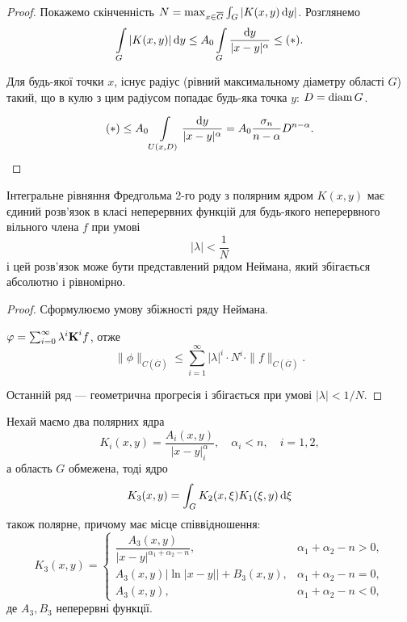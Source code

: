 \begin{proof}
	Покажемо скінченність $N = \max_{x \in \overline G} \int_G |K(x, y) \diff y|$. Розглянемо 
	\begin{equation}
		\Int_G |K(x,y)| \diff y \le A_0 \Int_G \dfrac{\diff y}{|x - y|^\alpha} \le (*).
	\end{equation}

	Для будь-якої точки $x$, існує радіус (рівний максимальному діаметру області $G$) такий, що в кулю з цим радіусом попадає будь-яка точка $y$: $D = \diam G$.

	\begin{equation}
		(*) \le A_0 \Int_{U(x, D)} \dfrac{\diff y}{|x - y|^\alpha} = A_0 \dfrac{\sigma_n}{n - \alpha} D^{n - \alpha}.
	\end{equation}
\end{proof}

\begin{theorem}
	Інтегральне рівняння Фредгольма 2-го роду з полярним ядром $K(x, y)$ має єдиний розв'язок в класі неперервних функцій для будь-якого неперервного вільного члена $f$ при умові
	\begin{equation}
		|\lambda| < \dfrac{1}{N}
	\end{equation}
	і цей розв'язок може бути представлений рядом Неймана, який збігається абсолютно і рівномірно.
\end{theorem}

\begin{proof}
	Сформулюємо умову збіжності ряду Неймана. \medskip

	$\phi = \sum_{i = 0}^\infty \lambda^i \bf{K}^i f$, отже 
	\begin{equation}
		\|\phi\|_{C\left(\overline G\right)} \le \sum_{i = 1}^\infty |\lambda|^i \cdot N^i \cdot \|f\|_{C(\overline G)}.
	\end{equation}

	Останній ряд --- геометрична прогресія і збігається при умові $|\lambda| < 1 / N$.
\end{proof}

\begin{lemma}
	Нехай маємо два полярних ядра 
	\begin{equation}
		K_i(x, y) = \frac{A_i(x, y)}{|x - y|^\alpha_i}, \quad \alpha_i < n, \quad i = 1, 2,
	\end{equation}
	а область $G$ обмежена, тоді ядро 
	\begin{equation}
		K_3(x, y) = \int_G K_2(x, \xi) K_1(\xi, y) \diff \xi
	\end{equation}
	також полярне, причому має місце співвідношення:
	\begin{equation}
		K_3(x, y) = \begin{cases}
			\dfrac{A_3(x, y)}{|x - y|^{\alpha_1 + \alpha_2 - n}}, & \alpha_1 + \alpha_2 - n > 0, \\
			A_3(x, y) |\ln|x - y|| + B_3(x, y), & \alpha_1 + \alpha_2 - n = 0, \\
			A_3(x, y), & \alpha_1 + \alpha_2 - n < 0,
		\end{cases}
	\end{equation}
	де $A_3, B_3$ неперервні функції.
\end{lemma}


